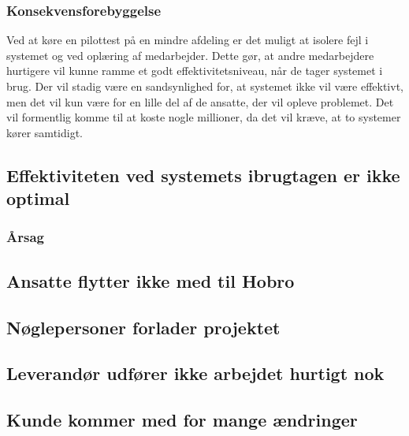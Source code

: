 \documentclass[10pt,a4paper,danish]{article}
\begin{document}
\subsubsection{Konsekvensforebyggelse}
Ved at køre en pilottest på en mindre afdeling er det muligt at isolere fejl i systemet og ved oplæring af medarbejder. 
Dette gør, at andre medarbejdere hurtigere vil kunne ramme et godt effektivitetsniveau, når de tager systemet i brug.
Der vil stadig være en sandsynlighed for, at systemet ikke vil være effektivt, men det vil kun være for en lille del af de ansatte, der vil opleve problemet. Det vil formentlig komme til at koste nogle millioner, da det vil kræve, at to systemer kører samtidigt.

\subsection{Effektiviteten ved systemets ibrugtagen er ikke optimal}
\subsubsection{Årsag}



\subsection{Ansatte flytter ikke med til Hobro}
\subsection{Nøglepersoner forlader projektet}
\subsection{Leverandør udfører ikke arbejdet hurtigt nok}
\subsection{Kunde kommer med for mange ændringer}
\end{document}
